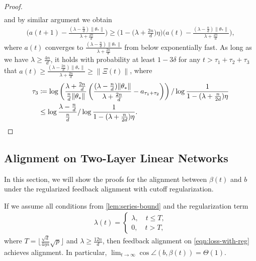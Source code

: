 \begin{proof}
\begin{align*}
    \end{align*}
    and by similar argument we obtain
    \begin{align*}
        \Big(a(t+1) - \frac{(\lambda - \frac{n}{d})\|\theta_*\|}{\lambda + \frac{2n}{d}}\Big) \geq  \Big(1-\Big(\lambda + \frac{2n}{d}\Big)\eta \Big) \Big(a(t) - \frac{(\lambda - \frac{n}{d})\|\theta_*\|}{\lambda + \frac{2n}{d}}\Big),
    \end{align*}
    where $a(t)$ converges to $\frac{(\lambda - \frac{n}{d})\|\theta_*\|}{\lambda + \frac{2n}{d}}$ from below exponentially fast. 
    As long as we have $\lambda\geq \frac{4n}{d}$, it holds with probability at least $1-3\delta$ for any $t>\tau_1+\tau_2+\tau_3$ that $a(t) \geq \frac{(\lambda - \frac{2n}{d})\|\theta_*\|}{\lambda + \frac{2n}{d}} \geq \|\Xi(t)\|$, where 
    \begin{align*}
        \tau_3 & \coloneqq \log\left(\frac{\lambda+\frac{2n}{d}}{\frac{n}{d}\|\theta_*\|} \left(\frac{(\lambda - \frac{n}{d})\|\theta_*\|}{\lambda + \frac{2n}{d}} - a_{\tau_1+\tau_2}\right)\right)/\log\frac{1}{1 - (\lambda+\frac{n}{2d})\eta} \\
        & \leq \log\frac{\lambda-\frac{n}{d}}{\frac{n}{d}}/\log\frac{1}{1 - (\lambda+\frac{n}{2d})\eta}.
    \end{align*}
\end{proof}

\subsection{Alignment on Two-Layer Linear Networks}

In this section, we will show the proofs for the alignment between $\beta(t)$ and $b$ under the regularized feedback alignment with cutoff regularization.

\begin{theorem}\label{thm:alignment}
    If we assume all conditions from \cref{lem:series-bound}  and the regularization term
    \begin{align*}
        \lambda(t) = 
        \begin{cases}
            \lambda, \quad t\leq T,\\
            0, \quad t > T,
        \end{cases}
    \end{align*}
    where $T = \lfloor \frac{\sqrt{d}}{4\eta n}\sqrt{p} \rfloor$ and $\lambda \geq \frac{12n}{d}$,
    then feedback alignment on \eqref{eqn:loss-with-reg} achieves alignment. In particular, $\lim_{t\to\infty} \cos\angle(b, \beta(t)) = \Theta(1)$.
\end{theorem}

